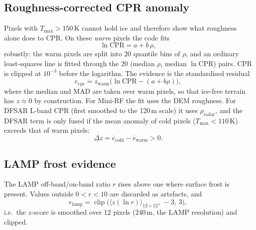 \documentclass[11pt,a4paper]{article}
\begin{document}
\subsection{Roughness-corrected CPR anomaly}
Pixels with $T_{\max}>150$\,K cannot hold ice and therefore show what roughness alone does to
CPR. On these \emph{warm} pixels the code fits
\begin{equation}
  \ln\mathrm{CPR} = a + b\,\rho ,
\end{equation}
robustly: the warm pixels are split into 20 quantile bins of $\rho$, and an ordinary least-squares
line is fitted through the 20 (median $\rho$, median $\ln\mathrm{CPR}$) pairs. CPR is clipped at
$10^{-3}$ before the logarithm. The evidence is the standardised residual
\begin{equation}
  e_{\mathrm{cpr}} = z_{\mathrm{warm}}\!\big(\ln\mathrm{CPR}-(a+b\rho)\big),
\end{equation}
where the median and MAD are taken over warm pixels, so that ice-free terrain has $z\approx0$ by
construction. For Mini-RF the fit uses the DEM roughness. For DFSAR L-band CPR (first smoothed to
the 120\,m scale) it uses $\rho_{\mathrm{radar}}$, and the DFSAR term is only fused if the mean
anomaly of cold pixels ($T_{\max}<110$\,K) exceeds that of warm pixels:
\begin{equation}
  \Delta z = \overline{e}_{\mathrm{cold}}-\overline{e}_{\mathrm{warm}} > 0 .
\end{equation}

\subsection{LAMP frost evidence}
The LAMP off-band/on-band ratio $r$ rises above one where surface frost is present. Values
outside $0<r<10$ are discarded as artefacts, and
\begin{equation}
  e_{\mathrm{lamp}} = \operatorname{clip}\!\big(\langle z(\ln r)\rangle_{12\times12},\,-3,\,3\big),
\end{equation}
i.e.\ the $z$-score is smoothed over 12 pixels (240\,m, the LAMP resolution) and clipped.
\end{document}
